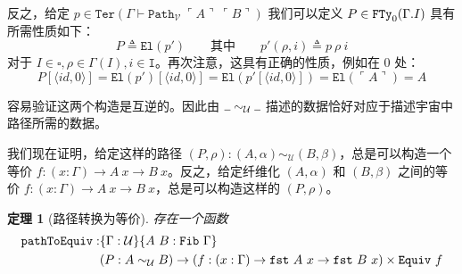 \documentclass{ctexrep}
\let\mathbb\relax %
\theoremstyle{plain}
\newtheorem{theorem}{定理}[section]
\theoremstyle{definition}
\theoremstyle{remark}
\newcommand\bbI{\mathbb{I}}
\newcommand\ttI{\mathtt{I}}
\newcommand{\ul}{{\rule[0ex]{0.5em}{0.4pt}}} %
\begin{document}
反之，给定 $p \in \mathtt{Ter}(\Gamma \vdash \mathtt{Path}_{\mathcal{V}}\ \ulcorner A \urcorner\ \ulcorner B \urcorner)$ 我们可以定义 $P \in \mathtt{FTy}_0(\Gamma.\bbI)$ 具有所需性质如下：
\[
P \triangleq \mathtt{El}(p') \qquad \text{其中} \qquad p'(\rho, i) \triangleq p\ \rho\ i
\]
对于 $I \in \square, \rho \in \Gamma(I), i \in \ttI$。再次注意，这具有正确的性质，例如在 $0$ 处：
\[
P[\langle  id , 0\rangle] = \mathtt{El}(p')[\langle  id , 0\rangle] = \mathtt{El}(p'[\langle  id , 0\rangle]) = \mathtt{El}(\ulcorner A \urcorner) = A
\]

容易验证这两个构造是互逆的。因此由 $\ul \sim_{\mathcal{U}}\ul $ 描述的数据恰好对应于描述宇宙中路径所需的数据。

我们现在证明，给定这样的路径 $(P, \rho) : (A, \alpha) \sim_{\mathcal{U}} (B, \beta)$，总是可以构造一个等价 $f : (x : \Gamma) \to A\ x \to B\ x$。反之，给定纤维化 $(A, \alpha)$ 和 $(B, \beta)$ 之间的等价 $f : (x : \Gamma) \to A\ x \to B\ x$，总是可以构造这样的 $(P, \rho)$。

\begin{theorem}[路径转换为等价]
存在一个函数
\begin{align}
\mathtt{pathToEquiv} : &\{\Gamma : \mathcal{U}\}\{A\ B : \mathtt{Fib}\ \Gamma\} \\
&(P : A \sim_{\mathcal{U}} B) \to (f : (x : \Gamma) \to \mathtt{fst}\ A\ x \to \mathtt{fst}\ B\ x) \times \mathtt{Equiv}\ f \notag
\end{align}
\end{theorem}
\end{document}
